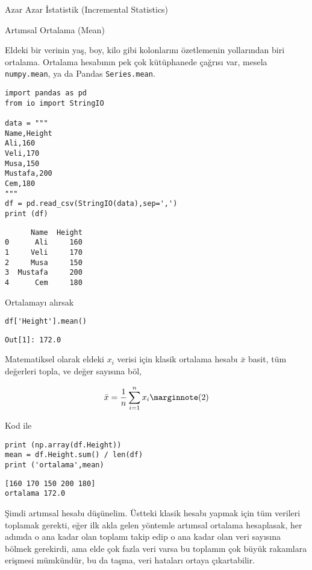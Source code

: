\documentclass[12pt,fleqn]{article}\usepackage{../../common}
\begin{document}
Azar Azar İstatistik (Incremental Statistics)

Artımsal Ortalama (Mean)

Eldeki bir verinin yaş, boy, kilo gibi kolonlarını özetlemenin yollarından biri
ortalama. Ortalama hesabının pek çok kütüphanede çağrısı var, mesela
\verb!numpy.mean!, ya da Pandas \verb!Series.mean!.


\begin{verbatim}
import pandas as pd
from io import StringIO

data = """
Name,Height
Ali,160
Veli,170
Musa,150
Mustafa,200
Cem,180
"""
df = pd.read_csv(StringIO(data),sep=',')
print (df)
\end{verbatim}

\begin{verbatim}
      Name  Height
0      Ali     160
1     Veli     170
2     Musa     150
3  Mustafa     200
4      Cem     180
\end{verbatim}

Ortalamayı alırsak

\begin{verbatim}
df['Height'].mean()
\end{verbatim}

\begin{verbatim}
Out[1]: 172.0
\end{verbatim}

Matematiksel olarak eldeki $x_i$ verisi için klasik ortalama hesabı $\bar{x}$
basit, tüm değerleri topla, ve değer sayısına böl,

$$
\bar{x} = \frac{1}{n} \sum _{i=1}^{n} x_i
\mlabel{2}
$$

Kod ile

\begin{verbatim}
print (np.array(df.Height))
mean = df.Height.sum() / len(df)
print ('ortalama',mean)
\end{verbatim}

\begin{verbatim}
[160 170 150 200 180]
ortalama 172.0
\end{verbatim}

Şimdi artımsal hesabı düşünelim. Üstteki klasik hesabı yapmak için tüm verileri
toplamak gerekti, eğer ilk akla gelen yöntemle artımsal ortalama hesaplasak, her
adımda o ana kadar olan toplamı takip edip o ana kadar olan veri sayısına bölmek
gerekirdi, ama elde çok fazla veri varsa bu toplamın çok büyük rakamlara
erişmesi mümkündür, bu da taşma, veri hataları ortaya çıkartabilir.
\end{document}
